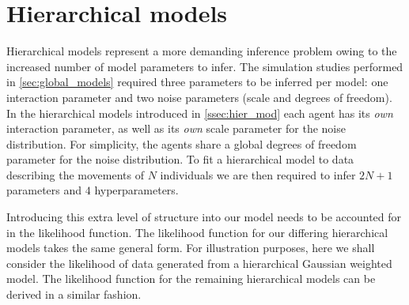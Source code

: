 \section{Hierarchical models}
\label{sec:hier_mod_studies}

Hierarchical models represent a more demanding inference problem owing to the
increased number of model parameters to infer. The simulation studies performed
in \cref{sec:global_models} required three parameters to be inferred per model:
one interaction parameter and two noise parameters (scale and degrees of
freedom). In the hierarchical models introduced in \cref{ssec:hier_mod} each
agent has its \emph{own} interaction parameter, as well as its \emph{own} scale
parameter for the noise distribution. For simplicity, the agents share a global
degrees of freedom parameter for the noise distribution. To fit a hierarchical
model to data describing the movements of $N$ individuals we are then required
to infer $2N+1$ parameters and $4$ hyperparameters.

Introducing this extra level of structure into our model needs to be accounted
for in the likelihood function. The likelihood function for our differing
hierarchical models takes the same general form. For illustration purposes,
here we shall consider the likelihood of data generated from a hierarchical
Gaussian weighted model. The likelihood function for the remaining hierarchical
models can be derived in a similar fashion.

